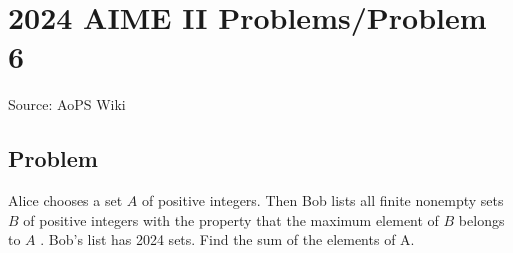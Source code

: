\documentclass[12pt]{article}
\begin{document}
\section*{{2024 AIME II Problems/Problem 6}}
Source: AoPS Wiki

\subsection*{Problem}
Alice chooses a set $A$ of positive integers. Then Bob lists all finite nonempty sets $B$ of positive integers with the property that the maximum element of $B$ belongs to $A$ . Bob's list has 2024 sets. Find the sum of the elements of A.
\end{document}
